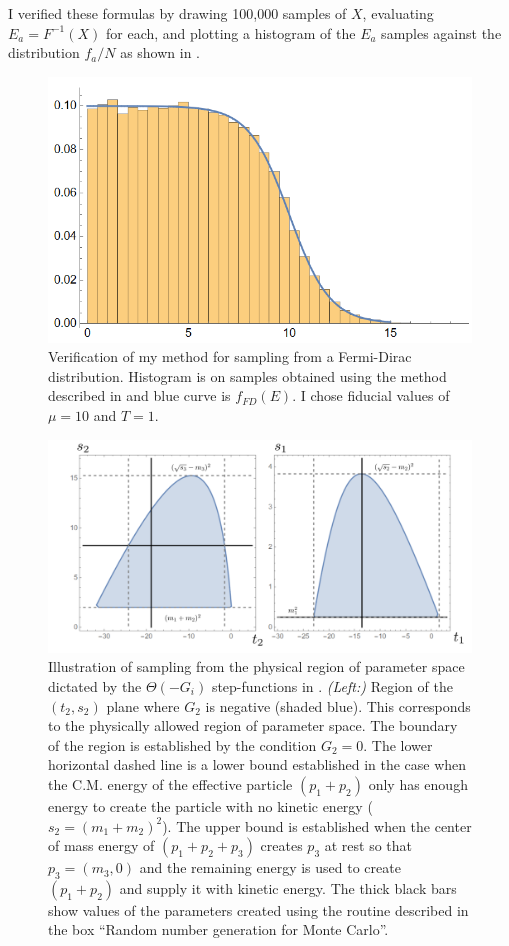 I verified these formulas by drawing 100,000 samples of $X$, evaluating $E_a = F^{-1}(X)$ for each, and plotting a histogram of the $E_a$ samples against the distribution $f_a / N$ as shown in . 
\begin{figure}[htbp]
    \centering
    \includegraphics[width=0.7\linewidth]{figs/fd-sampling.png}
    \caption{
        Verification of my method for sampling from a Fermi-Dirac distribution.
        Histogram is on samples obtained using the method described in  and blue curve is $f_{FD}(E)$.
        I chose fiducial values of $\mu = 10$ and $T = 1$. 
    }
    \label{fig:fermi-dirac-sampling}
\end{figure}


\begin{figure}[htbp]
    \centering
    \includegraphics[width=0.9\linewidth]{figs/kinematic-variable-diagram.png}
    \caption{
        Illustration of sampling from the physical region of parameter space dictated by the $\Theta(-G_i)$ step-functions in . 
        \emph{(Left:)}
        Region of the $(t_2, s_2)$ plane where $G_2$ is negative (shaded blue).
        This corresponds to the physically allowed region of parameter space.
        The boundary of the region is established by the condition $G_2 = 0$.
        The lower horizontal dashed line is a lower bound established in the case when the C.M. energy of the effective particle $(p_1 + p_2)$ only has enough energy to create the particle with no kinetic energy ($s_2 = (m_1 + m_2)^2$). 
        The upper bound is established when the center of mass energy of $(p_1 + p_2 + p_3)$ creates $p_3$ at rest so that $p_3 = (m_3, 0)$ and the remaining energy is used to create $(p_1 + p_2)$ and supply it with kinetic energy.
        The thick black bars show values of the parameters created using the routine described in the box ``Random number generation for Monte Carlo''.
    }
    \label{<label>}
\end{figure}

